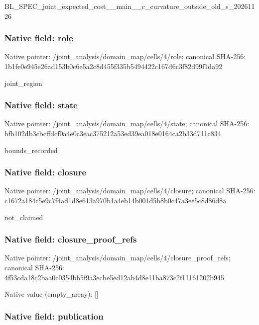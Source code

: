 \documentclass[10pt,a4paper]{article}
\begin{document}
BL\_SPEC\_joint\_expected\_c\allowbreak{}ost\_\_main\_\_c\_curvature\_o\allowbreak{}utside\_old\_s\_20261126


\subsubsection{Native field: role}


Native pointer: /joint\_analysis/domain\_map/cells/4/role; canonical SHA-256: 1b1fe0e945e26ad153b0c6e5\allowbreak{}a2c8d455f335b5494422c167\allowbreak{}d6c3f82d99f1da92


joint\_region


\subsubsection{Native field: state}


Native pointer: /joint\_analysis/domain\_m\allowbreak{}ap/cells/4/state; canonical SHA-256: bfb102db3cbcffdcf0a4e0c3\allowbreak{}eac375212a53ed39ea018e01\allowbreak{}64ca2b33d711c834


bounds\_recorded


\subsubsection{Native field: closure}


Native pointer: /joint\_analysis/domain\_m\allowbreak{}ap/cells/4/closure; canonical SHA-256: c1672a184c5e9c7f4ad1d8e6\allowbreak{}13a970b1a4eb14b001d5b8b0\allowbreak{}c47a3ee5c8d86d8a


not\_claimed


\subsubsection{Native field: closure\_proof\_refs}


Native pointer: /joint\_analysis/domain\_m\allowbreak{}ap/cells/4/closure\_proof\allowbreak{}\_refs; canonical SHA-256: 4f53cda18c2baa0c0354bb5f\allowbreak{}9a3ecbe5ed12ab4d8e11ba87\allowbreak{}3c2f11161202b945



Native value (empty\_array): []



\subsubsection{Native field: publication}
\end{document}
